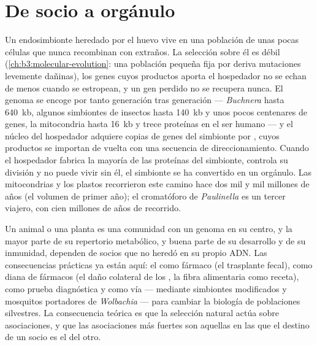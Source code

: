 \section{De socio a orgánulo}

\begin{proposition}\label{prop:b3:microbiomes:reduction}
Un endosimbionte heredado por el huevo vive en una población de unas
pocas células que nunca recombinan con extraños. La selección sobre él es
débil (\cref{ch:b3:molecular-evolution}: una población pequeña fija por
deriva mutaciones levemente dañinas), los genes cuyos productos aporta el
hospedador no se echan de menos cuando se estropean, y un gen perdido no
se recupera nunca. El genoma se encoge por tanto generación tras
generación --- \emph{Buchnera} hasta \qty{640}{kb}, algunos simbiontes de
insectos hasta \qty{140}{kb} y unos pocos centenares de genes, la
mitocondria hasta \qty{16}{kb} y trece proteínas en el ser humano --- y
el núcleo del hospedador adquiere copias de genes del simbionte por
\emph{}, cuyos productos se importan
de vuelta con una secuencia de direccionamiento. Cuando el hospedador
fabrica la mayoría de las proteínas del simbionte, controla su división y
no puede vivir sin él, el simbionte se ha convertido en un orgánulo. Las
mitocondrias y los plastos recorrieron este camino hace dos mil y mil
millones de años (el volumen de primer año); el cromatóforo de
\emph{Paulinella} es un tercer viajero, con cien millones de años de
recorrido.
\end{proposition}

\begin{remark}\label{rem:b3:microbiomes:individual}
Un animal o una planta es una comunidad con un genoma en su centro, y la
mayor parte de su repertorio metabólico, y buena parte de su desarrollo y
de su inmunidad, dependen de socios que no heredó en su propio ADN. Las
consecuencias prácticas ya están aquí: el  como fármaco (el
trasplante fecal), como diana de fármacos (el daño colateral de los
, la fibra alimentaria como receta), como prueba diagnóstica
y como vía --- mediante simbiontes modificados y mosquitos portadores de
\emph{Wolbachia} --- para cambiar la biología de poblaciones silvestres.
La consecuencia teórica es que la selección natural actúa sobre
asociaciones, y que las asociaciones más fuertes son aquellas en las que
el destino de un socio es el del otro.
\end{remark}

